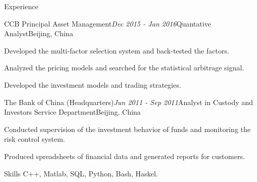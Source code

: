\documentclass{resume} %
\begin{document}
\begin{rSection}{Experience}


\begin{rSubsection}{CCB Principal Asset Management}{\em Dec 2015 - Jan 2016}{Quantative Analyst}{Beijing, China}
\item Developed the multi-factor selection system and back-tested the factors.
\item Analyzed the pricing models and searched for the statistical arbitrage signal.
\item Developed the investment models and trading strategies.

\end{rSubsection}


\begin{rSubsection}{The Bank of China (Headquarters)}{\em Jun 2011 - Sep 2011}{Analyst in Custody and Investors Service Department}{Beijing, China}
\item Conducted supervision of the investment behavior of funds and monitoring the risk control system.
\item Produced spreadsheets of financial data and generated reports for customers.  

\end{rSubsection}

\end{rSection}




\begin{rSection}{Skills}
C++, Matlab, SQL, Python, Bash, Haskel.

\end{rSection}













\end{document}
